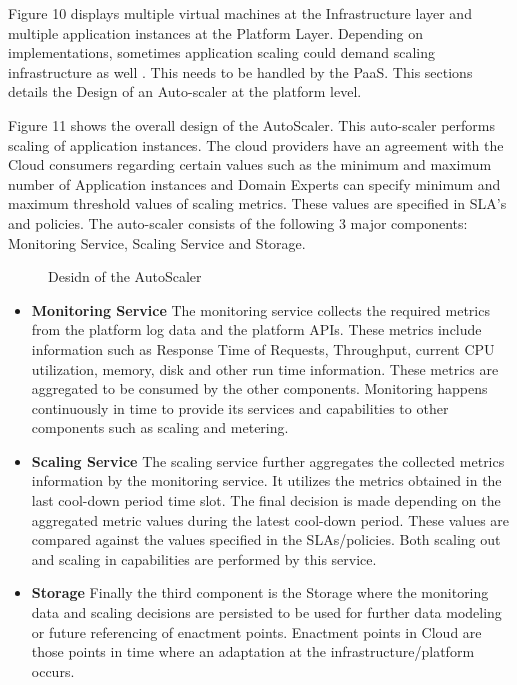 \documentclass[article,type=msc,colorback,12pt,accentcolor=tud7b,table]{tudthesis}
\begin{document}
 	Figure 10 displays multiple virtual machines at the Infrastructure layer and multiple application instances at the Platform Layer. Depending on implementations, sometimes application scaling could demand scaling infrastructure as well \cite{cf_scale}. This needs to be handled by the PaaS. This sections details the Design of an Auto-scaler at the platform level. 
		
 	Figure 11 shows the overall design of the AutoScaler. This auto-scaler performs scaling of application instances. The cloud providers have an agreement with the Cloud consumers regarding certain values such as the minimum and maximum number of Application instances and Domain Experts can specify minimum and maximum threshold values of scaling metrics. These values are specified in SLA's and policies. The auto-scaler consists of the following 3 major components: Monitoring Service, Scaling Service and Storage.
 	
 	 \begin{figure}[!h]
 	 	\begin{center}
 	 		\makebox[\textwidth]{\texttt{[image: C4]}}
 	 	\end{center}
 	 	\caption{Desidn of the AutoScaler}
 	 \end{figure}
 	
 	 	 \begin{itemize}
 	 	 	\item{\textbf{Monitoring Service}} 
 	 	 	\newline   
 	The monitoring service collects the required metrics from the platform log data and the platform APIs. These metrics include information such as Response Time of Requests, Throughput, current CPU utilization, memory, disk and other run time information. These metrics are aggregated to be consumed by the other components. Monitoring happens continuously in time to provide its services and capabilities to other components such as scaling and metering.
 	 	 	 	\item{\textbf{Scaling Service}} 
 	 	 	 	\newline   
 	The scaling service further aggregates the collected metrics information by the monitoring service. It utilizes the metrics obtained in the last cool-down period time slot. The final decision is made depending on the aggregated metric values during the latest cool-down period. These values are compared against the values specified in the SLAs/policies. Both scaling out and scaling in capabilities are performed by this service.
 	 	 	 	\item{\textbf{Storage}} 
 	 	 	 	\newline   
 	Finally the third component is the Storage where the monitoring data and scaling decisions are persisted to be used for further data modeling or future referencing of enactment points. Enactment points in Cloud are those points in time where an adaptation at the infrastructure/platform occurs. 
 \end{itemize}
\end{document}

